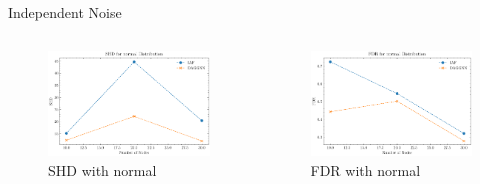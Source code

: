 \documentclass{beamer}
\begin{document}
\begin{frame}[allowframebreaks]{Independent Noise}
    \begin{columns}
        \begin{column}{0.5\textwidth}
            \begin{figure}
                \centering
                \includegraphics[width=\textwidth]{fig/SHD_independence_normal.pdf}
                \caption{SHD with normal}
                \label{fig:ind_gaussian_shd}
            \end{figure}
        \end{column}
        \begin{column}{0.5\textwidth}
            \begin{figure}
                \centering
                \includegraphics[width=\textwidth]{fig/FDR_independence_normal.pdf}
                \caption{FDR with normal}
                \label{fig:ind_gaussian_fdr}

\end{figure}
\end{column}
\end{columns}
\end{frame}
\end{document}
